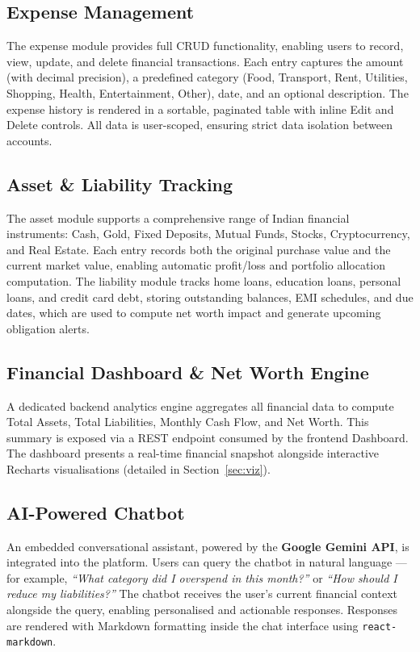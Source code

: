 \documentclass[12pt,a4paper]{article}
\begin{document}
\subsection{Expense Management}
The expense module provides full CRUD functionality, enabling users to record, view, update, and delete financial transactions. Each entry captures the amount (with decimal precision), a predefined category (Food, Transport, Rent, Utilities, Shopping, Health, Entertainment, Other), date, and an optional description. The expense history is rendered in a sortable, paginated table with inline Edit and Delete controls. All data is user-scoped, ensuring strict data isolation between accounts.

\subsection{Asset \& Liability Tracking}
The asset module supports a comprehensive range of Indian financial instruments: Cash, Gold, Fixed Deposits, Mutual Funds, Stocks, Cryptocurrency, and Real Estate. Each entry records both the original purchase value and the current market value, enabling automatic profit/loss and portfolio allocation computation. The liability module tracks home loans, education loans, personal loans, and credit card debt, storing outstanding balances, EMI schedules, and due dates, which are used to compute net worth impact and generate upcoming obligation alerts.

\subsection{Financial Dashboard \& Net Worth Engine}
A dedicated backend analytics engine aggregates all financial data to compute Total Assets, Total Liabilities, Monthly Cash Flow, and Net Worth. This summary is exposed via a REST endpoint consumed by the frontend Dashboard. The dashboard presents a real-time financial snapshot alongside interactive Recharts visualisations (detailed in Section~\ref{sec:viz}).

\subsection{AI-Powered Chatbot}
An embedded conversational assistant, powered by the \textbf{Google Gemini API}, is integrated into the platform. Users can query the chatbot in natural language — for example, \textit{``What category did I overspend in this month?''} or \textit{``How should I reduce my liabilities?''} The chatbot receives the user's current financial context alongside the query, enabling personalised and actionable responses. Responses are rendered with Markdown formatting inside the chat interface using \texttt{react-markdown}.
\end{document}
